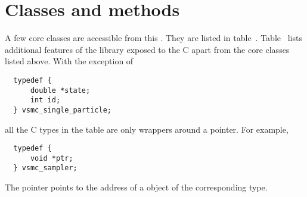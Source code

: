 \section{Classes and methods}
\label{app:sec:Classes and methods}

A few core classes are accessible from this \api. They are listed in
table~. Table~ lists additional features of the library exposed to the C \api apart
from the core classes listed above. With the exception of
\begin{Verbatim}
  typedef {
      double *state;
      int id;
  } vsmc_single_particle;
\end{Verbatim}
all the C types in the table are only wrappers around a pointer. For example,
\begin{Verbatim}
  typedef {
      void *ptr;
  } vsmc_sampler;
\end{Verbatim}
The pointer points to the address of a \cpp object of the corresponding type.

